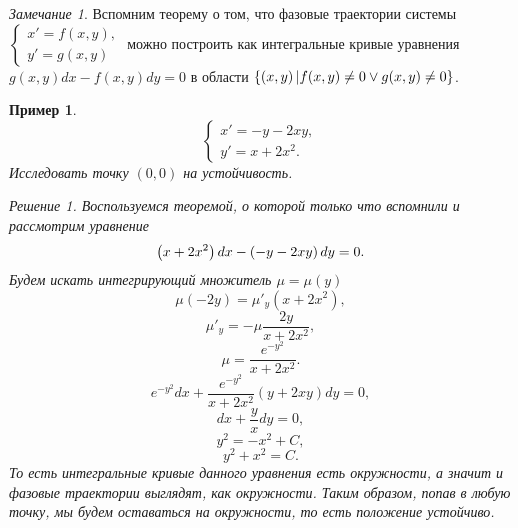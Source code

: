 \documentclass[a5paper, 11pt]{article}
\theoremstyle{definition}
\theoremstyle{plain}
\newtheorem{Ex}{Пример}
\theoremstyle{remark}
\newtheorem*{Note}{Замечание}
\newtheorem*{Solution}{Решение}
\begin{document}
	\begin{Note}
		Вспомним теорему о том, что фазовые траектории системы $\begin{cases}
			x' = f(x,y),\\
			y' = g(x,y)
		\end{cases}$ можно построить как интегральные кривые уравнения $g(x,y)dx - f(x,y)dy=0$ в области $\left\{\left(x,y\right) | f(x,y)\neq 0 \vee g(x,y)\neq 0\right\}$.
	\end{Note}

	\begin{Ex}
		\[
		\begin{cases}
			x' = -y-2xy,\\
			y'=x+2x^2.
		\end{cases}
		\]
		Исследовать точку $(0,0)$ на устойчивость.
		\begin{Solution}
			Воспользуемся теоремой, о которой только что вспомнили и рассмотрим уравнение
			\[
			\left(x+2x^2\right) dx - \left(-y-2xy\right) dy = 0.
			\]
			Будем искать интегрирующий множитель $\mu = \mu(y)$
			\[
			\mu (-2y) = \mu'_y (x+2x^2),
			\]
			\[
			\mu'_y = -\mu \frac{2y}{x+2x^2},
			\]
			\[
			\mu = \frac{e^{-y^2}}{x+2x^2}.
			\]
			\[
			e^{-y^2} dx + \frac{e^{-y^2}}{x+2x^2} (y+2xy)dy = 0,
			\]
			\[
			dx + \frac{y}{x}dy = 0,
			\]
			\[
			y^2 = -x^2 + C,
			\]
			\[
			y^2+x^2 = C.
			\]
			То есть интегральные кривые данного уравнения есть окружности, а значит и фазовые траектории выглядят, как окружности. Таким образом, попав в любую точку, мы будем оставаться на окружности, то есть положение устойчиво.
		\end{Solution}
	\end{Ex}
\end{document}
